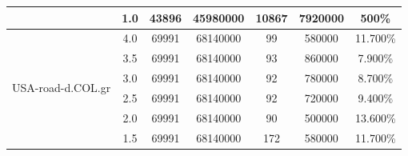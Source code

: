 \begin{table}[H]
\begin{adjustbox}{max width=\textwidth}
\begin{tabular}{|c|c|c|c|c|c|c|}
                                   & 1.0                                     & 43896                                & 45980000                                     & 10867                                  & 7920000                                        & 500\%                                                          \\ \hline
\multirow{7}{*}{USA-road-d.COL.gr} & 4.0                                     & 69991                                & 68140000                                     & 99                                     & 580000                                         & 11.700\%                                                       \\ \cline{2-7} 
                                   & 3.5                                     & 69991                                & 68140000                                     & 93                                     & 860000                                         & 7.900\%                                                        \\ \cline{2-7} 
                                   & 3.0                                     & 69991                                & 68140000                                     & 92                                     & 780000                                         & 8.700\%                                                        \\ \cline{2-7} 
                                   & 2.5                                     & 69991                                & 68140000                                     & 92                                     & 720000                                         & 9.400\%                                                        \\ \cline{2-7} 
                                   & 2.0                                     & 69991                                & 68140000                                     & 90                                     & 500000                                         & 13.600\%                                                       \\ \cline{2-7} 
                                   & 1.5                                     & 69991                                & 68140000                                     & 172                                    & 580000                                         & 11.700\%                                                       \\ \cline{2-7} 

\end{tabular}
\end{adjustbox}
\end{table}
